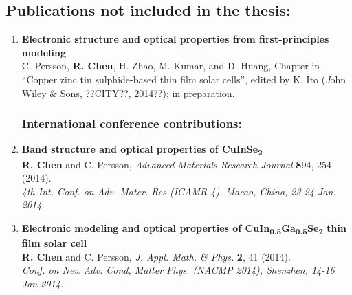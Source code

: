 \documentclass[a4paper, 12pt, titlepage,oneside,drop]{kthesis}
\begin{document}
\subsection*{Publications not included in the thesis:}
\begin{enumerate}
\renewcommand{\labelenumi}{\Roman{enumi}}
\setcounter{enumi}{3}

\subsubsection*{Book chapter:}
\item{}\textbf{Electronic structure and optical properties from first-principles modeling} \\
C. Persson, \textbf{R. Chen}, H. Zhao, M. Kumar, and D. Huang, Chapter in “Copper zinc tin sulphide-based thin film solar cells”,
edited by K. Ito ({\textit John Wiley $\&$ Sons}, ??CITY??, 2014??); in preparation.



\subsubsection*{International conference contributions:}
\renewcommand{\labelenumi}{\Roman{enumi}}
\setcounter{enumi}{4}

\item{} \textbf{Band structure and optical properties of CuInSe\textsubscript{2}}
\\ \textbf{R. Chen} and C. Persson, 
\textit{Advanced Materials Research Journal} {\textbf 894}, 254 (2014). \\
\textit{4th Int. Conf. on Adv. Mater. Res (ICAMR-4), Macao, China, 23-24 Jan. 2014.}


\item{} \textbf{Electronic modeling and optical properties of CuIn\textsubscript{0.5}Ga\textsubscript{0.5}Se\textsubscript{2} thin film solar cell}
\\ \textbf{R. Chen} and C. Persson,
\textit{J. Appl. Math. \& Phys.} {\textbf 2}, 41 (2014). \\
\textit{Conf. on New Adv. Cond, Matter Phys. (NACMP 2014), Shenzhen, 14-16 Jan 2014.}

\end{enumerate}

\newpage
\setcounter{page}{7}
\setcounter{secnumdepth}{3}
\setcounter{tocdepth}{3}
\tableofcontents
\end{document}
